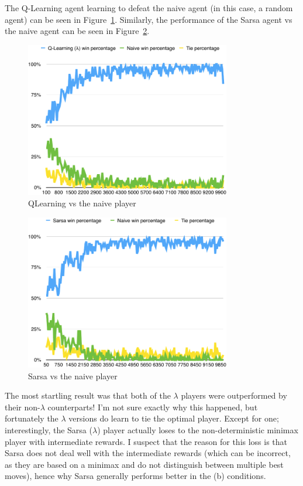 \documentclass{journal}
\begin{document}
The Q-Learning agent learning to defeat the naive agent (in this case, a random
agent) can be seen in Figure~\ref{fig:QLVNaive}. Similarly, the performance
of the Sarsa agent vs the naive agent can be seen in
Figure~\ref{fig:SarsaVNaive}.
\begin{figure}[h]
	\includegraphics[width=0.8\textwidth]{QLVNaive.pdf}
	\caption{QLearning vs the naive player}\label{fig:QLVNaive}
\end{figure}
\begin{figure}[h]
	\includegraphics[width=0.8\textwidth]{SarsaVNaive.pdf}
	\caption{Sarsa vs the naive player}\label{fig:SarsaVNaive}
\end{figure}


The most startling result was that both of the $\lambda{}$ players were
outperformed by their non-$\lambda{}$ counterparts! I'm not sure exactly why
this happened, but fortunately the $\lambda{}$ versions do learn to tie the
optimal player. Except for one; interestingly, the Sarsa ($\lambda{}$) player
actually loses to the non-deterministic minimax player with intermediate
rewards. I suspect that the reason for this loss is that Sarsa does not deal
well with the intermediate rewards (which can be incorrect, as they are
based on a minimax and do not distinguish between multiple best moves), hence
why Sarsa generally performs better in the (b) conditions.
\end{document}
